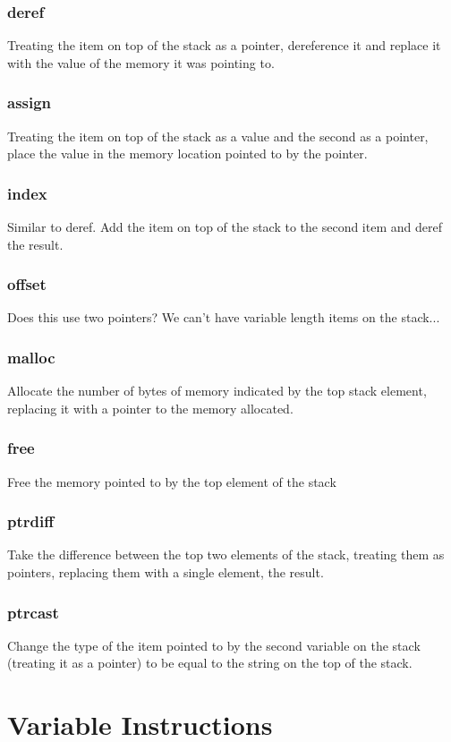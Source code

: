 \subsubsection{deref}
Treating the item on top of the stack as a pointer, dereference it and replace it with the value of the memory it was pointing to.
\subsubsection{assign}
Treating the item on top of the stack as a value and the second as a pointer, place the value in the memory location pointed to by the pointer.
\subsubsection{index}
Similar to deref. Add the item on top of the stack to the second item and deref the result.
\subsubsection{offset}
Does this use two pointers? We can't have variable length items on the stack...
\subsubsection{malloc}
Allocate the number of bytes of memory indicated by the top stack element, replacing it with a pointer to the memory allocated.
\subsubsection{free}
Free the memory pointed to by the top element of the stack
\subsubsection{ptrdiff}
Take the difference between the top two elements of the stack, treating them as pointers, replacing them with a single element, the result.
\subsubsection{ptrcast}
Change the type of the item pointed to by the second variable on the stack (treating it as a pointer) to be equal to the string on the top of the stack.

\section{Variable Instructions}
